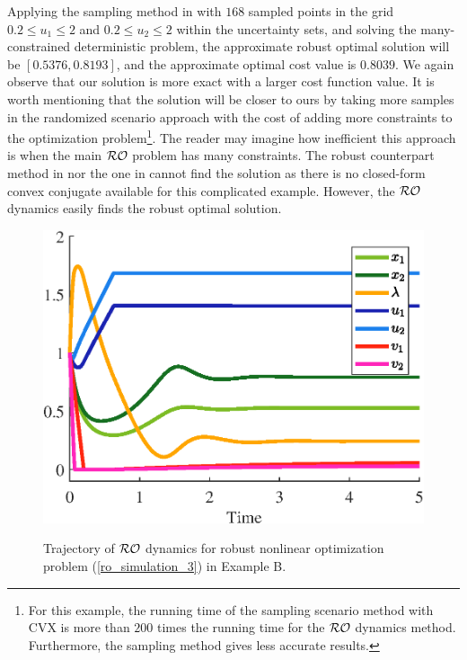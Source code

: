 \documentclass[journal,twoside,web]{ieeecolor}
\begin{document}
Applying the sampling method in \cite{calafiore2004} with $168$ sampled points in the grid $0.2 \leq u_1 \leq 2$ and $0.2 \leq u_2 \leq 2$ within the uncertainty sets, and solving the many-constrained deterministic problem, the approximate robust optimal solution will be $[0.5376, 0.8193]$, and the approximate optimal cost value is $0.8039$. We again observe that our solution is more exact with a larger cost function value. It is worth mentioning that the solution will be closer to ours by taking more samples in the randomized scenario approach with the cost of adding more constraints to the optimization problem\footnote{For this example, the running time of the sampling scenario method with CVX is more than $200$ times the running time for the ${\cal RO}$ dynamics method.
Furthermore, the sampling method gives less accurate results.}. The reader may imagine how inefficient this approach is when the main $\cal{RO}$ problem has many constraints. The robust counterpart method in \cite{bental2009} nor the one in \cite[~Table 1]{gorissen20152} cannot find the solution as there is no closed-form convex conjugate available for this complicated example. However, the ${\cal RO}$ dynamics easily finds the robust optimal solution.
\begin{figure}
\begin{center}
\includegraphics[scale=0.55]{trajectories_nonlinear_exp_no_RC.eps}
{\color{blue} \caption{Trajectory of ${\cal RO}$ dynamics for robust nonlinear optimization problem (\ref{ro_simulation_3}) in Example B.}}
\label{trajectories_nonlinear_exp_no_RC}
\end{center}
\end{figure}
\end{document}
